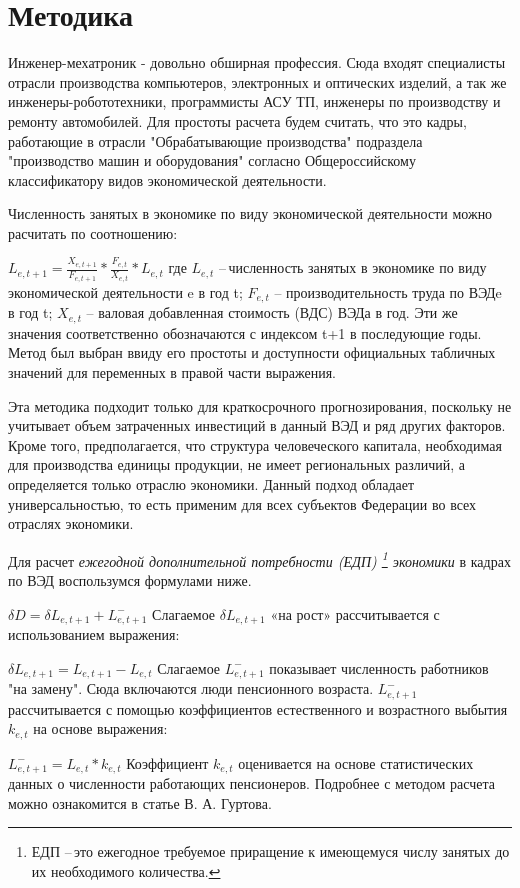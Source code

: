 \section{Методика}
Инженер-мехатроник - довольно обширная профессия. Сюда входят специалисты
отрасли производства компьютеров, электронных и оптических изделий, а так же
инженеры-робототехники, программисты АСУ ТП, инженеры по производству и
ремонту автомобилей. Для простоты расчета будем считать, что это кадры, работающие
в отрасли "Обрабатывающие производства" подраздела "производство машин и
оборудования" согласно Общероссийскому классификатору видов экономической деятельности\cite{economic-action-types}.

Численность занятых в экономике по виду экономической деятельности
можно расчитать по соотношению: 
\par
$L_{e, t+1} = \frac{X_{e, t+1}}{F_{e, t+1}} * \frac{F_{e, t}}{X_{e, t}} * L_{e, t}$
\newline
где $L_{e,t}$ – численность занятых в экономике по виду экономической деятельности e в год t;
$F_{e,t}$ – производительность труда по ВЭДe в год t; $X_{e,t}$ – валовая добавленная стоимость (ВДС) ВЭДа в год. Эти же значения соответственно обозначаются с индексом t+1 в последующие годы. Метод был выбран ввиду его простоты и доступности официальных табличных значений для переменных в правой части выражения.  

Эта методика подходит только для краткосрочного прогнозирования, поскольку не учитывает объем затраченных инвестиций в данный ВЭД и ряд других факторов. 
Кроме того, предполагается, что структура человеческого капитала, необходимая для производства единицы продукции, 
не имеет региональных различий, а определяется только отраслю экономики. 
Данный подход обладает универсальностью, то есть применим для всех субъектов Федерации во всех отраслях экономики. 
\par
Для расчет \textit{ежегодной дополнительной потребности (ЕДП)
\footnote{ЕДП – это ежегодное требуемое приращение к имеющемуся числу занятых до их необходимого количества.} экономики} в кадрах по ВЭД воспользумся формулами ниже. 

\par
$\delta D = \delta L_{e, t+1} + L_{e, t+1}^{-}$
\newline
Слагаемое $\delta L_{e, t+1}$ «на рост» рассчитывается с использованием выражения:
\par
$\delta L_{e, t+1} = L_{e, t+1} - L_{e, t}$
\newline
Слагаемое $L_{e, t+1}^{-}$ показывает численность работников "на замену". Сюда включаются
люди пенсионного возраста. $L_{e, t+1}^{-}$ рассчитывается
с помощью коэффициентов естественного и возрастного выбытия $k_{e,t}$ на основе выражения:
\par
$L_{e, t+1}^{-} =  L_{e, t} * k_{e,t}$
\newline
Коэффициент $k_{e,t}$ оценивается на основе статистических данных о численности работающих
пенсионеров. Подробнее с методом расчета можно ознакомится в статье В. А. Гуртова\cite{estimate-method}.


